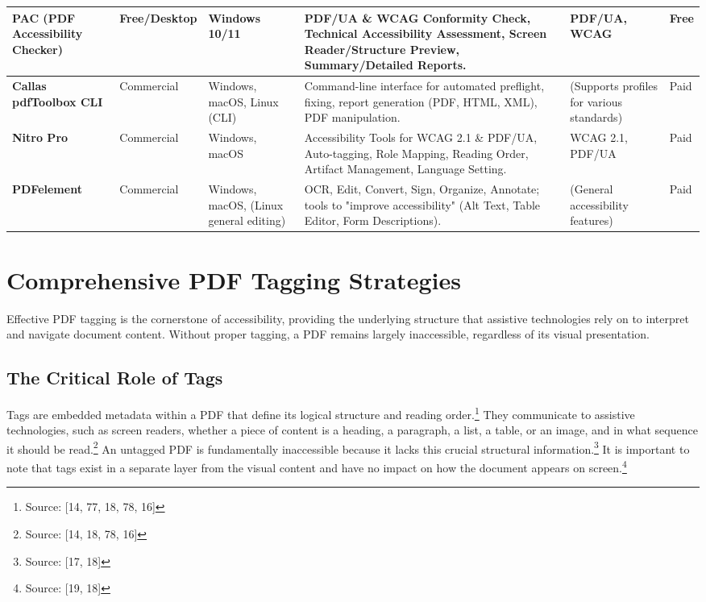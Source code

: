 \begin{longtable}{|l|l|l|p{6cm}|l|l|}
\hline
\textbf{PAC (PDF Accessibility Checker)} & Free/Desktop & Windows 10/11 & PDF/UA \& WCAG Conformity Check, Technical Accessibility Assessment, Screen Reader/Structure Preview, Summary/Detailed Reports. & PDF/UA, WCAG & Free \\
\hline
\textbf{Callas pdfToolbox CLI} & Commercial & Windows, macOS, Linux (CLI) & Command-line interface for automated preflight, fixing, report generation (PDF, HTML, XML), PDF manipulation. & (Supports profiles for various standards) & Paid \\
\hline
\textbf{Nitro Pro} & Commercial & Windows, macOS & Accessibility Tools for WCAG 2.1 \& PDF/UA, Auto-tagging, Role Mapping, Reading Order, Artifact Management, Language Setting. & WCAG 2.1, PDF/UA & Paid \\
\hline
\textbf{PDFelement} & Commercial & Windows, macOS, (Linux general editing) & OCR, Edit, Convert, Sign, Organize, Annotate; tools to "improve accessibility" (Alt Text, Table Editor, Form Descriptions). & (General accessibility features) & Paid \\
\hline
\end{longtable}

\section{Comprehensive PDF Tagging Strategies}

Effective PDF tagging is the cornerstone of accessibility, providing the underlying structure that assistive technologies rely on to interpret and navigate document content. Without proper tagging, a PDF remains largely inaccessible, regardless of its visual presentation.

\subsection{The Critical Role of Tags}

Tags are embedded metadata within a PDF that define its logical structure and reading order.\footnote{Source: [14, 77, 18, 78, 16]} They communicate to assistive technologies, such as screen readers, whether a piece of content is a heading, a paragraph, a list, a table, or an image, and in what sequence it should be read.\footnote{Source: [14, 18, 78, 16]} An untagged PDF is fundamentally inaccessible because it lacks this crucial structural information.\footnote{Source: [17, 18]} It is important to note that tags exist in a separate layer from the visual content and have no impact on how the document appears on screen.\footnote{Source: [19, 18]}

